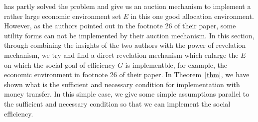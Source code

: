 \parencite{Maskin00} has partly solved the problem and give us an auction mechanism to implement a rather large economic 
environment set $E$ in this one good allocation environment. However, as the authors pointed out in the footnote 26 of 
their paper, some utility forms can not be implemented by their auction mechanism. In this section, through combining the 
insights of the two authors with the power of revelation mechanism, we try and find a direct revelation mechanism  which
enlarge the $E$ on which the social goal of efficiency $G$ is implementble, for example, the economic environment in footnote
26 of their paper.
In Theorem~\ref{thm}, we have shown what is the sufficient and necessary condition for implementation with money 
transfer. In this simple case, we give some simple assumptions parallel to the sufficient and necessary condition
so that we can implement the social efficiency.

